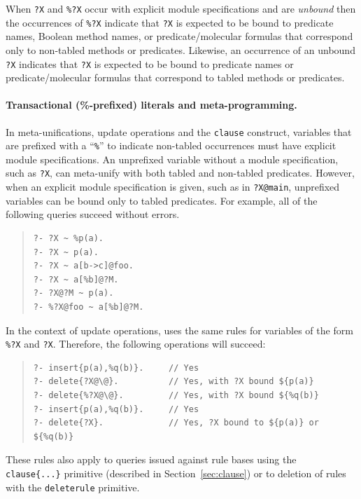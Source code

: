 \documentclass[11pt]{article}
\newcommand{\ERGO}{\mbox{\smaller{\ensuremath{\cal{E}}\smaller{{\sc{RGO}}}}}\xspace}
\newcommand{\FLSYSTEM}{\ERGO}
\begin{document}
When {\tt ?X} and {\tt \%?X} occur with explicit module specifications and
are \emph{unbound} then the occurrences of {\tt \%?X} indicate that {\tt ?X}
is expected to be bound to predicate names, Boolean method names, or
predicate/molecular formulas that correspond only to non-tabled methods or
predicates. Likewise, an occurrence of an unbound {\tt ?X} indicates that
{\tt ?X} is expected to be bound to predicate names or predicate/molecular
formulas that correspond to tabled methods or predicates.

\paragraph{Transactional (\%-prefixed) literals and meta-programming.}
In meta-unifications, update operations and the {\tt clause} construct,
variables that are prefixed with a ``{\tt \%}'' to indicate non-tabled
occurrences must have explicit module specifications. An unprefixed
variable without a module specification, such as {\tt ?X}, can meta-unify
with both tabled and non-tabled predicates.  However, when an explicit
module specification is given, such as in {\tt ?X@main}, unprefixed
variables can be bound only to tabled predicates. For example,
all of the following queries succeed without errors.

\begin{quote}
\begin{verbatim}
?- ?X ~ %p(a).      
?- ?X ~ p(a).         
?- ?X ~ a[b->c]@foo.  
?- ?X ~ a[%b]@?M.      
?- ?X@?M ~ p(a).     
?- %?X@foo ~ a[%b]@?M.
\end{verbatim}
\end{quote}

In the context of update operations, \FLSYSTEM uses the same rules for
variables of the form {\tt \%?X} and {\tt ?X}. Therefore, the
following operations will succeed:
\begin{quote}
\begin{verbatim}
?- insert{p(a),%q(b)}.     // Yes
?- delete{?X@\@}.          // Yes, with ?X bound ${p(a)}
?- delete{%?X@\@}.         // Yes, with ?X bound ${%q(b)}
?- insert{p(a),%q(b)}.     // Yes
?- delete{?X}.             // Yes, ?X bound to ${p(a)} or ${%q(b)}
\end{verbatim}
\end{quote}

These rules also apply to queries issued against rule bases using the {\tt
  clause\{...\}} primitive (described in Section~\ref{sec:clause}) or to deletion of rules with the {\tt deleterule} primitive.
\end{document}

